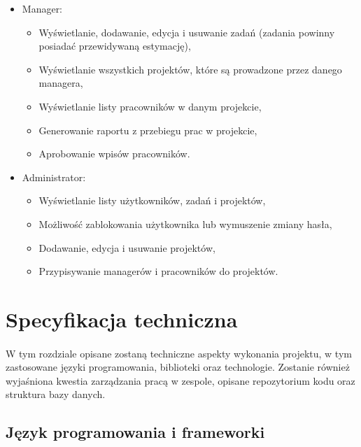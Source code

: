 \documentclass[a4paper, 12pt, oneside]{article}
\begin{document}
\begin{itemize}
\begin{itemize}
			\end{itemize}
			
			\item Manager:
			
			\begin{itemize}
			
			\item Wyświetlanie, dodawanie, edycja i usuwanie zadań (zadania powinny posiadać przewidywaną estymację),
\item Wyświetlanie wszystkich projektów, które są prowadzone przez danego managera,
\item Wyświetlanie listy pracowników w danym projekcie,
\item Generowanie raportu z przebiegu prac w projekcie,
\item Aprobowanie wpisów pracowników.
			
			\end{itemize}
			
			\item Administrator:
			
			\begin{itemize}
			
			\item Wyświetlanie listy użytkowników, zadań i projektów,
\item Możliwość zablokowania użytkownika lub wymuszenie zmiany hasła,
\item Dodawanie, edycja i usuwanie projektów,
\item Przypisywanie managerów i pracowników do projektów.
			
			\end{itemize}
			
			
			
		\end{itemize}
		
	\section{Specyfikacja techniczna}
	\paragraph{}W tym rozdziale opisane zostaną techniczne aspekty wykonania projektu, w tym zastosowane języki programowania, biblioteki oraz technologie. Zostanie również wyjaśniona kwestia zarządzania pracą w zespole, opisane repozytorium kodu oraz struktura bazy danych.
		\subsection{Język programowania i frameworki}
\end{document}
